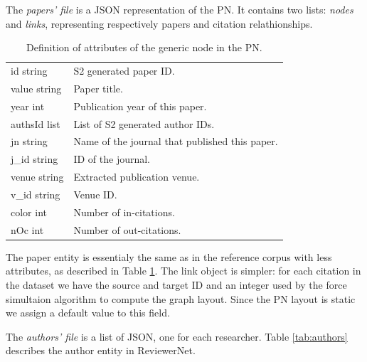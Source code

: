 The \emph{papers' file} is a JSON representation of the PN. It contains two lists: \textit{nodes} and \textit{links}, representing respectively papers and citation relathionships. 
\begin{table}[!ht]
    \centering
    \begin{tabular}{ll}
    id {\color[HTML]{656565}string}    & S2 generated paper ID.           \\ 
    value {\color[HTML]{656565}string} & Paper title.                      \\
    year {\color[HTML]{656565}int}     & Publication year of this paper.   \\
    authsId {\color[HTML]{656565}list} & List of S2 generated author IDs.  \\                
    jn {\color[HTML]{656565}string}                                          & Name of the journal that published this paper. \\
    j\_id {\color[HTML]{656565}string}                                        & ID of the journal.                             \\
    venue {\color[HTML]{656565}string}                                       & Extracted publication venue.                   \\
    v\_id {\color[HTML]{656565}string}                                        & Venue ID.                                      \\
    color {\color[HTML]{656565}int}    & Number of in-citations.            \\  
    nOc {\color[HTML]{656565}int} & Number of out-citations. 
\end{tabular}
    \caption{Definition of attributes of the generic node in the PN. \label{tab:nodes}}
   
    \end{table}

    The paper entity is essentialy the same as in the reference corpus with less attributes, as described in Table \ref{tab:nodes}. The link object is simpler: for each citation in the dataset we have the source and target ID and an integer used by the force simultaion algorithm to compute the graph layout. Since the PN layout is static we assign a default value to this field. 
    
    The \emph{authors' file} is a list of JSON, one for each researcher. Table \ref{tab:authors} describes the author entity in ReviewerNet.

